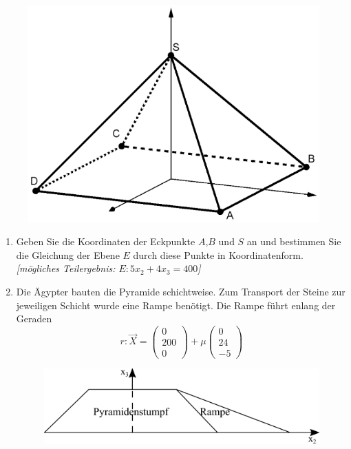 \documentclass[a4paper,12pt]{article}
\begin{document}
  \begin{figure}[H]
    \centering
    \includegraphics[width=0.5\columnwidth]{210227_pyramide.png}
  \end{figure}




\begin{enumerate}[label={\alph*)}]
  \item Geben Sie die Koordinaten der Eckpunkte $A$,$B$ und $S$ an und bestimmen Sie die Gleichung der Ebene $E$ durch diese Punkte in Koordinatenform.\\
    {\it [mögliches Teilergebnis: $E: 5x_2 + 4x_3 = 400$]}
  \item Die Ägypter bauten die Pyramide schichtweise. Zum Transport der Steine zur jeweiligen Schicht wurde eine Rampe benötigt. Die Rampe führt enlang der Geraden\\
    \[ r: \vec{X}= \begin{pmatrix} 0 \\ 
                                  200 \\
                                  0 
                  \end{pmatrix}
                 + \mu 
                    \begin{pmatrix} 0 \\ 
                                  24 \\
                                 -5 
                  \end{pmatrix}
                  \]

  \begin{figure}[H]
    \centering
    \includegraphics[width=0.5\columnwidth]{210227_pyramidenStumpfRampe.png}
  \end{figure}


\end{enumerate}
\end{document}
